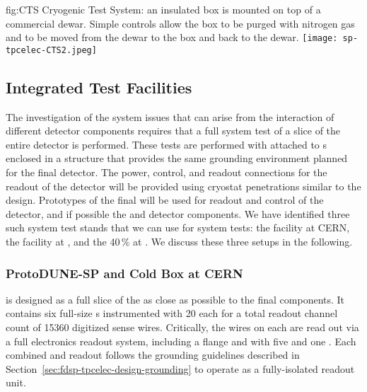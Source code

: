 \begin{dunefigure}
{fig:CTS}
{Cryogenic Test System: an insulated box is mounted on top of a commercial \lntwo dewar.  Simple controls allow the box to be purged with nitrogen gas and \lntwo to be moved from the dewar to the box and back to the dewar.}
\texttt{[image: sp-tpcelec-CTS2.jpeg]}
\end{dunefigure}


\subsection{Integrated Test Facilities}
\label{sec:fdsp-tpcelec-qa-facilities}

The investigation of the system issues that can arise from the interaction 
of different detector components requires that a full system test of a slice
of the entire detector is performed. These tests are performed with 
attached to s enclosed in a structure that provides the same
grounding environment planned for the final  detector. The
power, control, and readout connections for the readout of the detector
will be provided using cryostat penetrations similar to the 
design. Prototypes of the final  will be used for readout and
control of the detector, and if possible the  and 
detector components. We have identified three such system test stands
that we can use for system tests: the  facility at CERN, the
 facility at , and the \num{40}\,\%  at .
We discuss these three setups in the following.

\subsubsection{ProtoDUNE-SP and Cold Box at CERN}
\label{sec:fdsp-tpcelec-qa-facilities-pdune}

 is designed as a full slice of the  as close as 
possible to the final   components. It contains six full-size 
 s instrumented with \num{20}  each for a 
total readout channel count of \num{15360} digitized sense wires. Critically, 
the wires on each  are read out via a full  electronics readout 
system, including a  flange and  with five  
and one . Each combined  and  readout follows 
the grounding guidelines described in Section~\ref{sec:fdsp-tpcelec-design-grounding} 
to operate as a fully-isolated readout unit.

